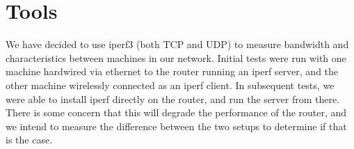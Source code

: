 \section{Tools}

We have decided to use iperf3 (both TCP and UDP) to measure bandwidth
and characteristics between machines in our network. Initial tests
were run with one machine hardwired via ethernet to the router running
an iperf server, and the other machine wirelessly connected as an
iperf client. In subsequent tests, we were able to install iperf
directly on the router, and run the server from there. There is some
concern that this will degrade the performance of the router, and we
intend to measure the difference between the two setups to determine
if that is the case.
